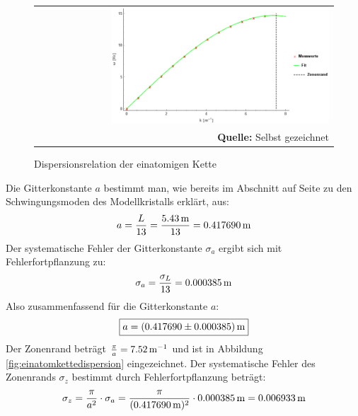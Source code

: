 \documentclass[a4paper,titlepage]{scrartcl}
\numberwithin{equation}{section}
\begin{document}
\begin{figure}[H]
	\centering
	\begin{tabular}{@{}r@{}}
		\includegraphics[width=0.75\textwidth]{dispersionsrelationeinatom.png}\\
		\footnotesize\sffamily\textbf{Quelle:} Selbst gezeichnet
	\end{tabular}
	\caption{Dispersionsrelation der einatomigen Kette}
    \label{fig:dispersionsrelationeinatom}
\end{figure}
Die Gitterkonstante $a$ bestimmt man, wie bereits im Abschnitt auf Seite \pageref{eq:einatommodell} zu den Schwingungsmoden des Modellkristalls erklärt, aus:
\begin{equation*}
a=\frac{L}{13}=\frac{\unit[5.43]{m}}{13}=\unit[0.417690]{m}
\end{equation*}
Der systematische Fehler der Gitterkonstante $\sigma_a$ ergibt sich mit Fehlerfortpflanzung zu:
\begin{equation*}
\sigma_a=\frac{\sigma_L}{13}=\unit[0.000385]{m}
\end{equation*}
Also zusammenfassend für die Gitterkonstante $a$:
\begin{equation*}
\boxed{a=\unit[(0.417690 \pm 0.000385)]{m}}
\end{equation*}
Der Zonenrand beträgt $\frac{\pi}{a}=\unit[7.52]{m^{-1}}$ und ist in Abbildung \ref{fig:einatomkettedispersion} eingezeichnet. Der systematische Fehler des Zonenrands $\sigma_z$ bestimmt durch Fehlerfortpflanzung beträgt:
\begin{equation*}
\sigma_z=\frac{\pi}{a^2} \cdot \sigma_a=\frac{\pi}{(\unit[0.417690]{m})^2} \cdot \unit[0.000385]{m}=\unit[0.006933]{m}
\end{equation*}
\end{document}
